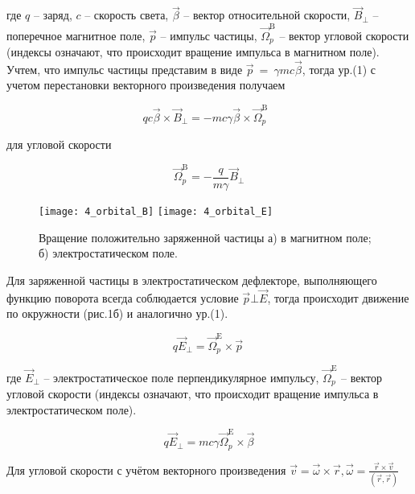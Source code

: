 \noindent где $q$ – заряд, $c$ – скорость света, $\vec{\beta}$ – вектор относительной скорости, ${\vec{B}}_\bot$ – поперечное магнитное поле, $\vec{p}$ – импульс частицы, ${\vec{\Omega}}_p^{\textrm{B}}$ – вектор угловой скорости (индексы означают, что происходит вращение импульса в магнитном поле). Учтем, что импульс частицы представим в виде $\vec{p}\ =\ \gamma mc\vec{\beta}$, тогда ур.(1) с учетом перестановки векторного произведения получаем

\begin{equation}	
qc\vec{\beta}\times{\vec{B}}_\bot=-mc\gamma\vec{\beta}\times{\vec{\Omega}}_p^{\textrm{B}}\ \ \ 	
\end{equation}

\noindent для угловой скорости

\begin{equation}
 {\vec{\Omega}}_p^{\textrm{B}}=-\frac{q}{m\gamma}{\vec{B}}_\bot
\end{equation} 

\begin{figure}[!h]
  \centering
	\texttt{[image: 4\_orbital\_B]}
	\texttt{[image: 4\_orbital\_E]}
   \caption{Вращение положительно заряженной частицы а) в магнитном поле; б) электростатическом поле.}
   \label{fig:4_orbital_B_E}
\end{figure}

\par Для заряженной частицы в электростатическом дефлекторе, выполняющего функцию поворота всегда соблюдается условие $\vec{p} \bot \vec{E}$, тогда происходит движение по окружности (рис.1б) и аналогично ур.(1).

\begin{equation}
q{\vec{E}}_\bot={\vec{\Omega}}_p^{\textrm{E}}\times\vec{p}\ 
\end{equation} 

\noindent где ${\vec{E}}_\bot$ – электростатическое поле перпендикулярное импульсу, ${\vec{\Omega}}_p^{\textrm{E}}$ – вектор угловой скорости (индексы означают, что происходит вращение импульса в электростатическом поле).

\begin{equation}
q{\vec{E}}_\bot=mc\gamma{\vec{\Omega}}_p^{\textrm{E}}\times\vec{\beta}
\end{equation} 

\noindent Для угловой скорости с учётом векторного произведения $\vec{v}=\vec{\omega}\times\vec{r}, \vec{\omega}=\frac{\vec{r}\times\vec{v}}{(\vec{r},\vec{r})}$

